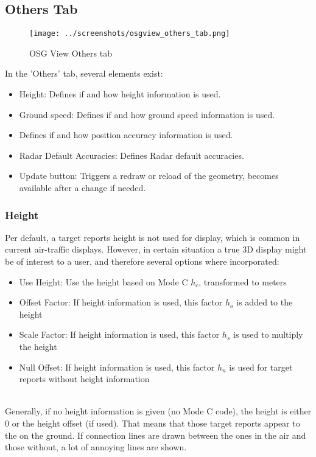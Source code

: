 \subsection{Others Tab}

\begin{figure}[H]
   \center
    \texttt{[image: ../screenshots/osgview\_others\_tab.png]}
  \caption{OSG View Others tab}
\end{figure}

In the 'Others' tab, several elements exist:

\begin{itemize}
 \item Height: Defines if and how height information is used.
 \item Ground speed: Defines if and how ground speed information is used.
 \item Defines if and how position accuracy information is used.
 \item Radar Default Accuracies: Defines Radar default accuracies.
 \item Update button: Triggers a redraw or reload of the geometry, becomes available after a change if needed.
\end{itemize} 

\subsubsection{Height}
\label{sec:others_height}

Per default, a target reports height is not used for display, which is common in current air-traffic displays. However, in certain situation a true 3D display might be of interest to a user, and therefore several options where incorporated:

\begin{itemize}
 \item Use Height: Use the height based on Mode C $h_c$, transformed to meters
 \item Offset Factor: If height information is used, this factor $h_o$ is added to the height
 \item Scale Factor: If height information is used, this factor $h_s$ is used to multiply the height
 \item Null Offset: If height information is used, this factor $h_n$ is used for target reports without height information
\end{itemize}
\ \\

Generally, if no height information is given (no Mode C code), the height is either $0$ or the height offset (if used). That means that those target reports appear to the on the ground. If connection lines are drawn between the ones in the air and those without, a lot of annoying lines are shown. \\

